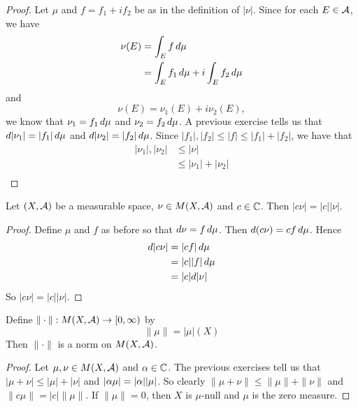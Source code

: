 \documentclass{book}
\begin{document}
	\begin{proof}
		Let $\mu$ and $f = f_1 + i f_2$ be as in the definition of $|\nu|$. Since for each $E \in \mathcal{A}$, we have 
		\begin{align*}
			\nu(E) 
			&= \int_E f \, d \mu\\
			&= \int_E f_1 \, d \mu + i \int_E f_2 \, d \mu
		\end{align*}
		and $$\nu(E) = \nu_1(E) + i\nu_2(E),$$
		we know that $\nu_1 = f_1 \, d \mu$ and $\nu_2 = f_2 \, d \mu$. 
		A previous exercise tells us that $d|\nu_1| = |f_1|\, d \mu$ and $d |\nu_2| = |f_2|\, d \mu$. Since $|f_1|, |f_2| \leq |f| \leq |f_1|+|f_2|$, we have that 
		\begin{align*}
			|\nu_1|, |\nu_2| 
			&\leq |\nu| \\
			&\leq |\nu_1| + |\nu_2|\\
		\end{align*}
	\end{proof}
	
	\begin{ex}  
		Let  $(X, \mathcal{A})$ be a measurable space, $\nu \in M(X, \mathcal{A})$ and $c \in \mathbb{C}$. Then $| c \nu | = | c | | \nu |$.
	\end{ex}
	
	\begin{proof}
		Define $\mu$ and $f$ as before so that $d \nu = f \, d \mu$. Then $d (c \nu) = c f \, d \mu$. Hence 
		\begin{align*}
			d | c \nu | 
			&= | cf | \, d \mu \\
			&= | c | | f | \, d \mu\\
			&= | c | d| \nu |
		\end{align*}
		So $| c \nu | = | c | |  \nu |$.
	\end{proof}

	\begin{ex}  
	Define $\|\cdot \|: M(X, \mathcal{A}) \rightarrow [0,\infty)$ by $$\|\mu \|= | \mu | (X)$$ 
	Then $\|\cdot \|$ is a norm on $M(X, \mathcal{A})$. 
	\end{ex}
	
	\begin{proof}
		Let $\mu, \nu \in M(X, \mathcal{A})$ and $\alpha \in \mathbb{C}$. The previous exercises tell us that $| \mu + \nu | \leq | \mu | + | \nu |$ and $| \alpha \mu | = | \alpha | | \mu |$. So clearly $\|\mu + \nu \|\leq \|\mu \|+ \|\nu \|$ and $\|c \mu \|= | c | \|\mu \|$. If $\|\mu \|= 0$, then $X$ is $\mu$-null and $\mu$ is the zero measure.
	\end{proof}
	
\end{document}
